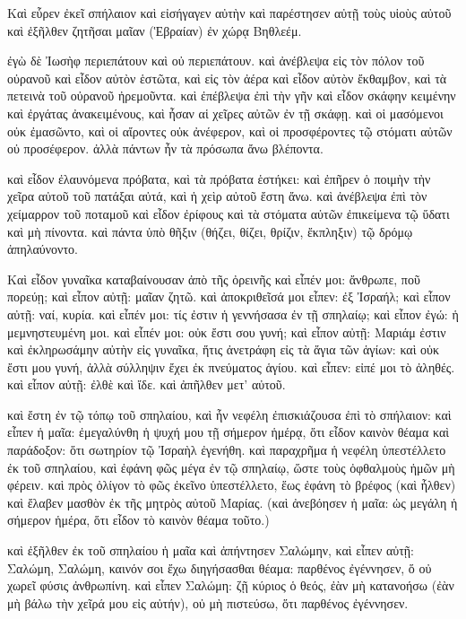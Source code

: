 \pend\pstart
{}

\pend\setcounter{pstartL}{1}\pstart
Καὶ εὗρεν ἐκεῖ σπήλαιον καὶ εἰσήγαγεν αὐτὴν καὶ παρέστησεν αὐτῇ τοὺς υἱοὺς αὐτοῦ καὶ ἐξῆλθεν ζητῆσαι μαῖαν (Ἑβραίαν) ἐν χώρᾳ Βηθλεέμ.

\pend\pstart
ἐγὼ δὲ Ἰωσὴφ περιεπάτουν καὶ οὐ περιεπάτουν. καὶ ἀνέβλεψα εἰς τὸν πόλον τοῦ οὐρανοῦ καὶ εἶδον αὐτὸν ἑστῶτα, καὶ εἰς τὸν ἀέρα καὶ εἶδον αὐτὸν ἔκθαμβον, καὶ τὰ πετεινὰ τοῦ οὐρανοῦ ἠρεμοῦντα. καὶ ἐπέβλεψα ἐπὶ τὴν γῆν καὶ εἶδον σκάφην κειμένην καὶ ἐργάτας ἀνακειμένους, καὶ ἦσαν αἱ χεῖρες αὐτῶν ἐν τῇ σκάφῃ. καὶ οἱ μασόμενοι οὐκ ἐμασῶντο, καὶ οἱ αἴροντες οὐκ ἀνέφερον, καὶ οἱ προσφέροντες τῷ στόματι αὐτῶν οὐ προσέφερον. ἀλλὰ πάντων ἦν τὰ πρόσωπα ἄνω βλέποντα.

\pend\pstart
καὶ εἶδον ἐλαυνόμενα πρόβατα, καὶ τὰ πρόβατα ἑστήκει: καὶ ἐπῆρεν ὁ ποιμὴν τὴν χεῖρα αὐτοῦ τοῦ πατάξαι αὐτά, καὶ ἡ χεὶρ αὐτοῦ ἔστη ἄνω. καὶ ἀνέβλεψα ἐπὶ τὸν χείμαρρον τοῦ ποταμοῦ καὶ εἶδον ἐρίφους καὶ τὰ στόματα αὐτῶν ἐπικείμενα τῷ ὕδατι καὶ μὴ πίνοντα. καὶ πάντα ὑπὸ θῆξιν (θήζει, θίζει, θρίζιν, ἔκπληξιν) τῷ δρόμῳ ἀπηλαύνοντο.

\pend\pstart
{}

\pend\setcounter{pstartL}{1}\pstart
Καὶ εἶδον γυναῖκα καταβαίνουσαν ἀπὸ τῆς ὀρεινῆς καὶ εἶπέν μοι: ἄνθρωπε, ποῦ πορεύῃ; καὶ εἶπον αὐτῇ: μαῖαν ζητῶ. καὶ ἀποκριθεῖσά μοι εἶπεν: ἐξ Ἰσραήλ; καὶ εἶπον αὐτῇ: ναί, κυρία. καὶ εἶπέν μοι: τίς ἐστιν ἡ γεννήσασα ἐν τῇ σπηλαίῳ; καὶ εἶπον ἐγώ: ἡ μεμνηστευμένη μοι. καὶ εἶπέν μοι: οὐκ ἔστι σου γυνή; καὶ εἶπον αὐτῇ: Μαριάμ ἐστιν καὶ ἐκληρωσάμην αὐτὴν εἰς γυναῖκα, ἥτις ἀνετράφη εἰς τὰ ἅγια τῶν ἁγίων: καὶ οὐκ ἔστι μου γυνή, ἀλλὰ σύλληψιν ἔχει ἐκ πνεύματος ἁγίου. καὶ εἶπεν: εἰπέ μοι τὸ ἀληθές. καὶ εἶπον αὐτῇ: ἐλθὲ καὶ ἴδε. καὶ ἀπῆλθεν μετ' αὐτοῦ.

\pend\pstart
καὶ ἔστη ἐν τῷ τόπῳ τοῦ σπηλαίου, καὶ ἦν νεφέλη ἐπισκιάζουσα ἐπὶ τὸ σπήλαιον: καὶ εἶπεν ἡ μαῖα: ἐμεγαλύνθη ἡ ψυχή μου τῇ σήμερον ἡμέρᾳ, ὅτι εἶδον καινὸν θέαμα καὶ παράδοξον: ὅτι σωτηρίον τῷ Ἰσραὴλ ἐγενήθη. καὶ παραχρῆμα ἡ νεφέλη ὑπεστέλλετο ἐκ τοῦ σπηλαίου, καὶ ἐφάνη φῶς μέγα ἐν τῷ σπηλαίῳ, ὥστε τοὺς ὀφθαλμοὺς ἡμῶν μὴ φέρειν. καὶ πρὸς ὀλίγον τὸ φῶς ἐκεῖνο ὑπεστέλλετο, ἕως ἐφάνη τὸ βρέφος (καὶ ἦλθεν) καὶ ἔλαβεν μασθὸν ἐκ τῆς μητρὸς αὐτοῦ Μαρίας. (καὶ ἀνεβόησεν ἡ μαῖα: ὡς μεγάλη ἡ σήμερον ἡμέρα, ὅτι εἶδον τὸ καινὸν θέαμα τοῦτο.)

\pend\pstart
καὶ ἐξῆλθεν ἐκ τοῦ σπηλαίου ἡ μαῖα καὶ ἀπήντησεν Σαλώμην, καὶ εἶπεν αὐτῇ: Σαλώμη, Σαλώμη, καινόν σοι ἔχω διηγήσασθαι θέαμα: παρθένος ἐγέννησεν, ὅ οὐ χωρεῖ φύσις ἀνθρωπίνη. καὶ εἶπεν Σαλώμη: ζῇ κύριος ὁ θεός, ἐὰν μὴ κατανοήσω (ἐὰν μὴ βάλω τὴν χεῖρά μου εἰς αὐτήν), οὐ μὴ πιστεύσω, ὅτι παρθένος ἐγέννησεν.

